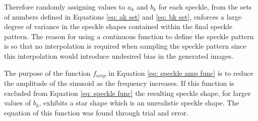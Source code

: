\documentclass[12pt,oneside,openany,a4paper, %
english, %
masters-t, goldenblock]{usthesis}
\begin{document}
Therefore randomly assigning values to $a_k$ and $b_k$ for each speckle, from the sets of numbers defined in Equations \ref{eq: ak set} and \ref{eq: bk set}, enforces a large degree of variance in the speckle shapes contained within the final speckle pattern. The reason for using a continuous function to define the speckle pattern is so that no interpolation is required when sampling the speckle pattern since this interpolation would introduce undesired bias in the generated images. 

The purpose of the function $f_{amp}$ in Equation \ref{eq: speckle amp func} is to reduce the amplitude of the sinusoid as the frequency increases. If this function is excluded from Equation \ref{eq: speckle func} the resulting speckle shape, for larger values of $b_k$, exhibits a star shape which is an unrealistic speckle shape. The equation of this function was found through trial and error. 


\end{document}
